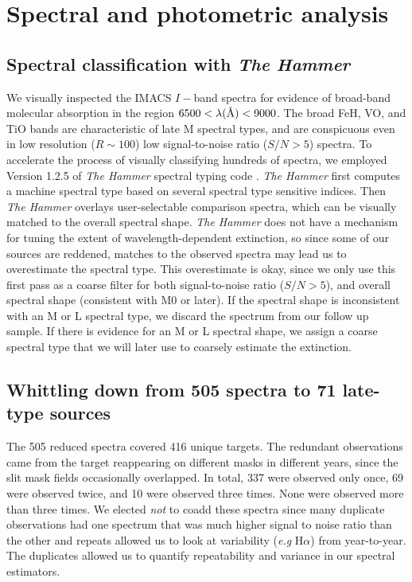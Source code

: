 \section{Spectral and photometric analysis}

\subsection{Spectral classification with \emph{The Hammer}}
We visually inspected the IMACS $I-$band spectra for evidence of broad-band molecular absorption in the region $6500<\lambda(\mbox{\normalfont\AA})<9000 $.  The broad FeH, VO, and TiO bands are characteristic of late M spectral types, and are conspicuous even in low resolution ($R\sim100$) low signal-to-noise ratio ($S/N > 5$) spectra.  To accelerate the process of visually classifying hundreds of spectra, we employed Version 1.2.5 of \emph{The Hammer} spectral typing code \citep{2007AJ....134.2398C,2011AJ....141...97W}.  \emph{The Hammer} first computes a machine spectral type based on several spectral type sensitive indices.  Then \emph{The Hammer} overlays user-selectable comparison spectra, which can be visually matched to the overall spectral shape.  \emph{The Hammer} does not have a mechanism for tuning the extent of wavelength-dependent extinction, so since some of our sources are reddened, matches to the observed spectra may lead us to overestimate the spectral type.  This overestimate is okay, since we only use this first pass as a coarse filter for both signal-to-noise ratio ($S/N >5$), and overall spectral shape (consistent with M0 or later).  If the spectral shape is inconsistent with an M or L spectral type, we discard the spectrum from our follow up sample.  If there is evidence for an M or L spectral shape, we assign a coarse spectral type that we will later use to coarsely estimate the extinction.

\subsection{ Whittling down from 505 spectra to 71 late-type sources}
The 505 reduced spectra covered 416 unique targets.  The redundant observations came from the target reappearing on different masks in different years, since the slit mask fields occasionally overlapped.  In total, 337 were observed only once, 69 were observed twice, and 10 were observed three times.  None were observed more than three times.  We elected \emph{not} to coadd these spectra since many duplicate observations had one spectrum that was much higher signal to noise ratio than the other and repeats allowed us to look at variability (\emph{e.g} H$\alpha$) from year-to-year.  The duplicates allowed us to quantify repeatability and variance in our spectral estimators.  

